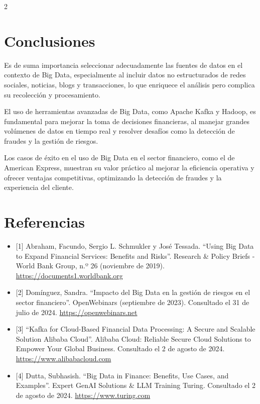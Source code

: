 \documentclass[12pt,spanish,Letterpaper,openany]{book}
\begin{document}
\begin {multicols}{2}
\hypertarget{conclusiones-12}{%
\section{Conclusiones}\label{conclusiones-12}}

Es de suma importancia seleccionar adecuadamente las fuentes de datos en el contexto de Big Data, especialmente al incluir datos no estructurados de redes sociales, noticias, blogs y transacciones, lo que enriquece el análisis pero complica su recolección y procesamiento.

El uso de herramientas avanzadas de Big Data, como Apache Kafka y Hadoop, es fundamental para mejorar la toma de decisiones financieras, al manejar grandes volúmenes de datos en tiempo real y resolver desafíos como la detección de fraudes y la gestión de riesgos.

Los casos de éxito en el uso de Big Data en el sector financiero, como el de American Express, muestran su valor práctico al mejorar la eficiencia operativa y ofrecer ventajas competitivas, optimizando la detección de fraudes y la experiencia del cliente.

\hypertarget{referencias-11}{%
\section{Referencias}\label{referencias-11}}

\begin{itemize}
\item
  {[}1{]} Abraham, Facundo, Sergio L. Schmukler y José Tessada. ``Using Big Data to Expand Financial Services: Benefits and Risks''. Research \& Policy Briefs - World Bank Group, n.º 26 (noviembre de 2019).
  \href{https://documents1.worldbank.org/curated/en/505891573224492672/pdf/Using-Big-Data-to-Expand-Financial-Services-Benefits-and-Risks.pdf}{https://documents1.worldbank.org}
\item
  {[}2{]} Domínguez, Sandra. ``Impacto del Big Data en la gestión de riesgos en el sector financiero''. OpenWebinars (septiembre de 2023). Consultado el 31 de julio de 2024. \href{https://openwebinars.net/blog/impacto-del-big-data-en-la-gestion-de-riesgos-en-el-sector-financiero}{https://openwebinars.net}
\item
  {[}3{]} ``Kafka for Cloud-Based Financial Data Processing: A Secure and Scalable Solution Alibaba Cloud''. Alibaba Cloud: Reliable Secure Cloud Solutions to Empower Your Global Business. Consultado el 2 de agosto de 2024.
  \href{https://www.alibabacloud.com/tech-news/a/kafka/gtv2q09gbd-kafka-for-cloud-based-financial-data-processing-a-secure-and-scalable-solution}{https://www.alibabacloud.com}
\item
  {[}4{]} Dutta, Subhasish. ``Big Data in Finance: Benefits, Use Cases, and Examples''. Expert GenAI Solutions \& LLM Training \textbar{} Turing. Consultado el 2 de agosto de 2024. \href{https://www.turing.com/resources/big-data-in-finance\#1.-predictive-analysis}{https://www.turing.com}
\end{itemize}

\end {multicols}
\end{document}
